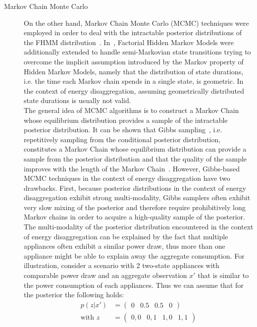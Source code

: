 \documentclass[11pt]{cmuthesis} %
\begin{document}
\begin{description}
\item[Markov Chain Monte Carlo] On the other hand, Markov Chain Monte Carlo (MCMC) techniques were employed in order to deal with the intractable posterior distributions of the FHMM distribution~\cite{johnson2013bayesian,jia2015fully,el2009rjmcmc,egarter2015paldi}. In~\cite{johnson2013bayesian}, Factorial Hidden Markov Models were additionally extended to handle semi-Markovian state transitions trying to overcome the implicit assumption introduced by the Markov property of Hidden Markov Models, namely that the distribution of state durations, i.e. the time each Markov chain spends in a single state, is geometric. In the context of energy disaggregation, assuming geometrically distributed state durations is usually not valid.\\
The general idea of MCMC algorithms is to construct a Markov Chain whose equilibrium distribution provides a sample of the intractable posterior distribution. It can be shown that Gibbs sampling~\cite{casella1992explaining}, i.e. repetitively sampling from the conditional posterior distribution, constitutes a Markov Chain whose equilibrium distribution can provide a sample from the posterior distribution and that the quality of the sample improves with the length of the Markov Chain~\cite{geman1987stochastic}. However, Gibbs-based MCMC techniques in the context of energy disaggregation have two drawbacks. First, because posterior distributions in the context of energy disaggregation exhibit strong multi-modality, Gibbs samplers often exhibit very slow mixing of the posterior and therefore require prohibitively long Markov chains in order to acquire a high-quality sample of the posterior. The multi-modality of the posterior distribution encountered in the context of energy disaggregation can be explained by the fact that multiple appliances often exhibit a similar power draw, thus more than one appliance might be able to explain away the aggregate consumption. For illustration, consider a scenario with 2 two-state appliances with comparable power draw and an aggregate observation $x'$ that is similar to the power consumption of each appliances. Thus we can assume that for the posterior the following holds:
\begin{align*}
p(z|x') &= \begin{pmatrix}
0&
0.5&
0.5&
0
\end{pmatrix}\\
 \text{with } z &=\begin{pmatrix} 0,0&
0,1 &
1,0 &
1,1 
\end{pmatrix}
\end{align*}


\end{description}
\end{document}
